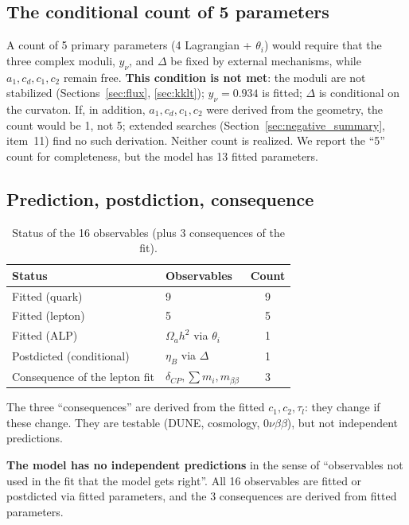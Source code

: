 \documentclass[12pt,a4paper]{article}
\numberwithin{equation}{section}
\begin{document}
\subsection{The conditional count of 5 parameters}
A count of 5 primary parameters (4 Lagrangian + \(\theta_i\)) would
require that the three complex moduli, \(y_\nu\), and \(\Delta\)
be fixed by external mechanisms, while \(a_1, c_d, c_1, c_2\) remain
free. \textbf{This condition is not met}: the moduli are not
stabilized (Sections~\ref{sec:flux}, \ref{sec:kklt});
\(y_\nu = 0.934\) is fitted; \(\Delta\) is conditional on the
curvaton. If, in addition, \(a_1, c_d, c_1, c_2\) were derived from
the geometry, the count would be 1, not 5; extended searches
(Section~\ref{sec:negative_summary}, item~11) find no such derivation.
Neither count is realized. We report the ``5'' count for completeness,
but the model has 13 fitted parameters.

\subsection{Prediction, postdiction, consequence}
\begin{table}[H]
\centering
\caption{Status of the 16 observables (plus 3 consequences of the fit).}
\begin{tabular}{llc}
\toprule
Status & Observables & Count \\
\midrule
Fitted (quark) & 9 & 9 \\
Fitted (lepton) & 5 & 5 \\
Fitted (ALP) & \(\Omega_a h^2\) via \(\theta_i\) & 1 \\
Postdicted (conditional) & \(\eta_B\) via \(\Delta\) & 1 \\
Consequence of the lepton fit & \(\delta_{CP}, \sum m_i, m_{\beta\beta}\) & 3 \\
\bottomrule
\end{tabular}
\end{table}

\noindent The three ``consequences'' are derived from the fitted
\(c_1, c_2, \tau_l\): they change if these change. They are testable
(DUNE, cosmology, \(0\nu\beta\beta\)), but not independent predictions.

\textbf{The model has no independent predictions} in the sense of
``observables not used in the fit that the model gets right''. All 16
observables are fitted or postdicted via fitted parameters, and the 3
consequences are derived from fitted parameters.
\end{document}
